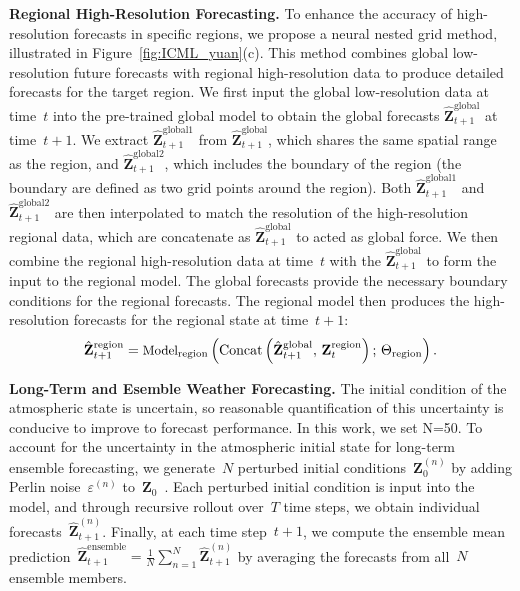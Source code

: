 \textbf{Regional High-Resolution Forecasting.} To enhance the accuracy of high-resolution forecasts in specific regions, we propose a neural nested grid method, illustrated in Figure~\ref{fig:ICML_yuan}(c). This method combines global low-resolution future forecasts with regional high-resolution data to produce detailed forecasts for the target region. We first input the global low-resolution data at time~$t$ into the pre-trained global model to obtain the global forecasts $\hat{\mathbf{Z}}_{t+1}^{\text{global}}$ at time~$t+1$. We extract $\hat{\mathbf{Z}}_{t+1}^{\text{global1}}$ from $\hat{\mathbf{Z}}_{t+1}^{\text{global}}$, which shares the same spatial range as the region, and $\hat{\mathbf{Z}}_{t+1}^{\text{global2}}$, which includes the boundary of the region (the boundary are defined as two grid points around the region). Both $\hat{\mathbf{Z}}_{t+1}^{\text{global1}}$ and $\hat{\mathbf{Z}}_{t+1}^{\text{global2}}$ are then interpolated to match the resolution of the high-resolution regional data, which are concatenate as $\hat{\mathbf{Z}}_{t+1}^{\text{global}}$ to acted as global force. We then combine the regional high-resolution data at time~$t$ with the $\hat{\mathbf{Z}}_{t+1}^{\text{global}}$ to form the input to the regional model. The global forecasts provide the necessary boundary conditions for the regional forecasts. The regional model then produces the high-resolution forecasts for the regional state at time~$t+1$:
\begin{equation}\small
       \hat{\mathbf{Z}}_{t+1}^{\text{region}} = \text{Model}_{\text{region}}\left( \operatorname{Concat}\left( \hat{\mathbf{Z}}_{t+1}^{\text{global}},\, \mathbf{Z}_t^{\text{region}} \right);\, \Theta_{\text{region}} \right).
\end{equation}

\textbf{Long-Term and Esemble Weather Forecasting.} The initial condition of the atmospheric state is uncertain, so reasonable quantification of this uncertainty is conducive to improve to forecast performance. In this work, we set N=50. To account for the uncertainty in the atmospheric initial state for long-term ensemble forecasting, we generate~$N$ perturbed initial conditions~$\mathbf{Z}_0^{(n)}$ by adding Perlin noise~$\varepsilon^{(n)}$ to~$\mathbf{Z}_0$~\cite{chen2023fuxi}. Each perturbed initial condition is input into the model, and through recursive rollout over~$T$ time steps, we obtain individual forecasts~$\hat{\mathbf{Z}}_{t+1}^{(n)}$. Finally, at each time step~$t+1$, we compute the ensemble mean prediction~$ \hat{\mathbf{Z}}_{t+1}^{\text{ensemble}} = \frac{1}{N} \sum_{n=1}^N \hat{\mathbf{Z}}_{t+1}^{(n)}$ by averaging the forecasts from all~$N$ ensemble members. 

